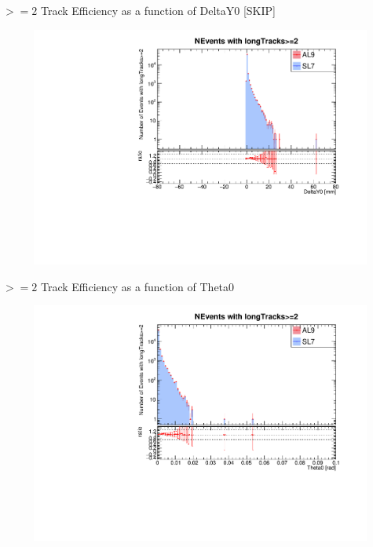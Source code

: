 \begin{frame}{$>=2$ Track Efficiency as a function of DeltaY0 [SKIP]}
    \begin{figure}
        \includegraphics[width=\linewidth]{./output/DeltaY0_greq2.pdf}
    \end{figure}
\end{frame}
\begin{frame}{$>=2$ Track Efficiency as a function of Theta0}
    \begin{figure}
        \includegraphics[width=\linewidth]{./output/Theta0_greq2.pdf}
    \end{figure}
\end{frame}
